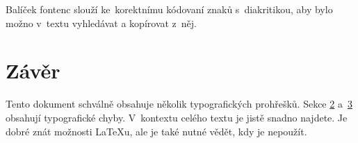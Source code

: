 \documentclass[twocolumn, a4paper, 10pt, notitlepage]{article}
\newcommand{\fontCMTT}[1]{\fontfamily{cmtt}\selectfont #1}
\begin{document}
Balíček {\fontCMTT{fontenc}} slouží ke~korektnímu kódovaní znaků s~diakritikou, aby bylo možno v~textu vyhledávat a ko\-pí\-ro\-vat z~něj.


\section{Závěr} 

Tento dokument schválně obsahuje několik typografických prohřešků. Sekce \hyperref[sec:section2]{2} a~\hyperref[sec:section3]{3} obsahují typografické chyby. V~kon\-textu celého textu je jistě snadno najdete. Je dobré znát možnosti {\LaTeX}u, ale je také nutné vědět, kdy je nepoužít.
\end{document}
